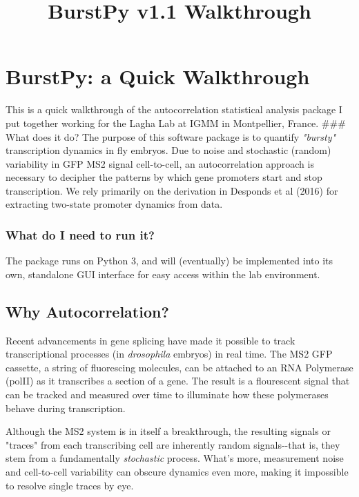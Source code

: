 \documentclass[11pt]{article}
\title{BurstPy v1.1 Walkthrough}
\begin{document}
    
    
    \maketitle
    
    

    
    \section{BurstPy: a Quick
Walkthrough}\label{burstpy-a-quick-walkthrough}

This is a quick walkthrough of the autocorrelation statistical analysis
package I put together working for the Lagha Lab at IGMM in Montpellier,
France. \#\#\# What does it do? The purpose of this software package is
to quantify \emph{"bursty"} transcription dynamics in fly embryos. Due
to noise and stochastic (random) variability in GFP MS2 signal
cell-to-cell, an autocorrelation approach is necessary to decipher the
patterns by which gene promoters start and stop transcription. We rely
primarily on the derivation in Desponds et al (2016) for extracting
two-state promoter dynamics from data.

\subsubsection{What do I need to run
it?}\label{what-do-i-need-to-run-it}

The package runs on Python 3, and will (eventually) be implemented into
its own, standalone GUI interface for easy access within the lab
environment.

    \subsection{Why Autocorrelation?}\label{why-autocorrelation}

Recent advancements in gene splicing have made it possible to track
transcriptional processes (in \emph{drosophila} embryos) in real time.
The MS2 GFP cassette, a string of fluorescing molecules, can be attached
to an RNA Polymerase (polII) as it transcribes a section of a gene. The
result is a flourescent signal that can be tracked and measured over
time to illuminate how these polymerases behave during transcription.

Although the MS2 system is in itself a breakthrough, the resulting
signals or "traces" from each transcribing cell are inherently random
signals-\/-that is, they stem from a fundamentally \emph{stochastic}
process. What's more, measurement noise and cell-to-cell variability can
obscure dynamics even more, making it impossible to resolve single
traces by eye.
\end{document}
